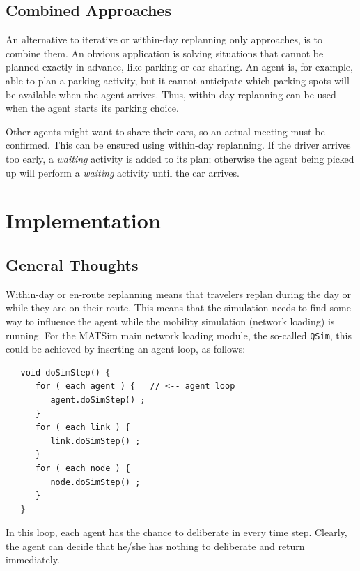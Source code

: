 \subsection{Combined Approaches} 
\label{sec:CombinedApproaches}
An alternative to iterative or within-day replanning only approaches, is to combine them. An obvious application is solving situations that cannot be planned exactly in advance, like parking or car sharing. An agent is, for example, able to plan a parking activity, but it cannot anticipate which parking spots will be available when the agent arrives. Thus, within-day replanning can be used when the agent starts its parking choice.

Other agents might want to share their cars, so an actual meeting must be confirmed. This can be ensured using within-day replanning. If the driver arrives too early, a \emph{waiting} activity is added to its plan; otherwise the agent being picked up will perform a \emph{waiting} activity until the car arrives.

\section{Implementation}
\subsection{General Thoughts}
Within-day or en-route replanning means that travelers replan during the day or while they are on their route.  This means that the simulation needs to find some way to influence the agent while the mobility simulation (network loading) is running. For the MATSim main network loading module, the so-called \lstinline$QSim$, this could be achieved by inserting an agent-loop, as follows:
\begin{lstlisting}
   void doSimStep() {
      for ( each agent ) {   // <-- agent loop
         agent.doSimStep() ;
      }
      for ( each link ) {
         link.doSimStep() ;
      }
      for ( each node ) {
         node.doSimStep() ;
      }
   }  
\end{lstlisting}
In this loop, each agent has the chance to deliberate in every time step.  Clearly, the agent can decide that he/she has nothing to deliberate and return immediately.

